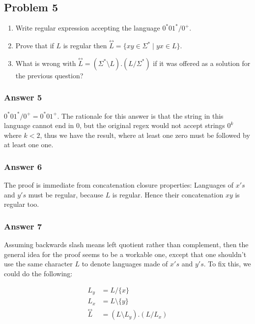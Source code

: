 \documentclass[11pt]{article}
\begin{document}
\subsection{Problem 5}
\label{sec:orgheadline12}
\begin{enumerate}
\item Write regular expression accepting the language \(0^*01^*/0^+\).
\item Prove that if \(L\) is regular then
\(\overset{\leftrightarrow}{L}=\{xy \in \Sigma^* \;|\; yx \in
      L\}\).
\item What is wrong with \(\overset{\leftrightarrow}{L} = (\Sigma^*
      \setminus L).(L / \Sigma^*)\) if it was offered as a solution for the
previous question?
\end{enumerate}

\subsubsection{Answer 5}
\label{sec:orgheadline9}
\(0^*01^*/0^+ = 0^*01^+\).  The rationale for this answer is that the string
in this language cannot end in 0, but the original regex would not accept
strings \(0^k\) where \(k < 2\), thus we have the result, where at least one
zero must be followed by at least one one.

\subsubsection{Answer 6}
\label{sec:orgheadline10}
The proof is immediate from concatenation closure properties: Languages of
\(x's\) and \(y's\) must be regular, because \(L\) is regular. Hence their
concatenation \(xy\) is regular too.

\subsubsection{Answer 7}
\label{sec:orgheadline11}
Assuming backwards slash means left quotient rather than complement, then
the general idea for the proof seems to be a workable one, except that one
shouldn't use the same character \(L\) to denote languages made of \(x's\) and
\(y's\).  To fix this, we could do the following:

\begin{align*}
  L_y &= L / \{ x \} \\
  L_x &= L \setminus \{ y \} \\
  \overset{\leftrightarrow}{L} &= (L \setminus L_y).(L / L_x)
\end{align*}
\end{document}
